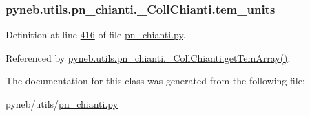 \subsubsection[{tem\+\_\+units}]{\setlength{\rightskip}{0pt plus 5cm}pyneb.\+utils.\+pn\+\_\+chianti.\+\_\+\+Coll\+Chianti.\+tem\+\_\+units}\label{classpyneb_1_1utils_1_1pn__chianti_1_1___coll_chianti_ac8f0c1513ef4a2f2d12c59fa380a495c}


Definition at line \hyperlink{pn__chianti_8py_source_l00416}{416} of file \hyperlink{pn__chianti_8py_source}{pn\+\_\+chianti.\+py}.



Referenced by \hyperlink{pn__chianti_8py_source_l00521}{pyneb.\+utils.\+pn\+\_\+chianti.\+\_\+\+Coll\+Chianti.\+get\+Tem\+Array()}.



The documentation for this class was generated from the following file\+:\begin{DoxyCompactItemize}
\item 
pyneb/utils/\hyperlink{pn__chianti_8py}{pn\+\_\+chianti.\+py}\end{DoxyCompactItemize}

